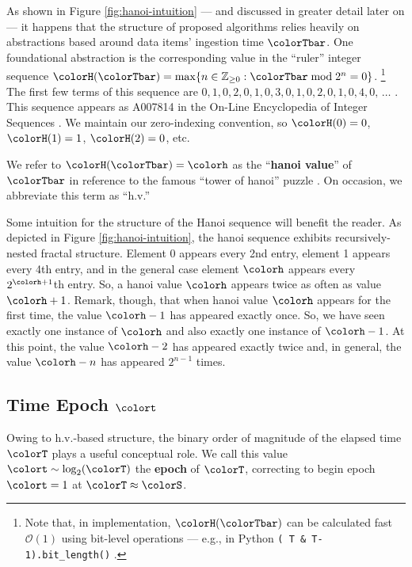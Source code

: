 

As shown in Figure \ref{fig:hanoi-intuition} --- and discussed in greater detail later on --- it happens that the structure of proposed algorithms relies heavily on abstractions based around data items' ingestion time $\colorTbar$.
One foundational abstraction is the corresponding value in the ``ruler'' integer sequence $\colorH(\colorTbar) = \max \{ n \in \mathbb{Z}_{\geq0} : \colorTbar \bmod 2^n = 0 \}$.%
\footnote{%
Note that, in implementation, $\colorH(\colorTbar)$ can be calculated fast $\mathcal{O}(1)$ using bit-level operations --- e.g., in Python \texttt{(~T \& T-1).bit\_length()} \citep{oeis}.
}
The first few terms of this sequence are $0,\allowbreak 1,\allowbreak 0,\allowbreak 2,\allowbreak 0,\allowbreak 1,\allowbreak 0,\allowbreak 3,\allowbreak 0,\allowbreak 1,\allowbreak 0,\allowbreak 2,\allowbreak 0,\allowbreak 1,\allowbreak 0,\allowbreak 4,\allowbreak 0,\allowbreak \,\ldots$ \quad .
This sequence appears as A007814 in the On-Line Encyclopedia of Integer Sequences \citep{oeis}.
We maintain our zero-indexing convention, so $\colorH(0) = 0$, $\colorH(1) = 1$, $\colorH(2) = 0$, etc.

We refer to $\colorH(\colorTbar) = \colorh$ as the ``\textbf{hanoi value}'' of $\colorTbar$ in reference to the famous ``tower of hanoi'' puzzle \citep{lucas1889jeux}.
On occasion, we abbreviate this term as ``h.v.''

Some intuition for the structure of the Hanoi sequence will benefit the reader.
As depicted in Figure \ref{fig:hanoi-intuition}, the hanoi sequence exhibits recursively-nested fractal structure.
Element 0 appears every 2nd entry, element 1 appears every 4th entry, and in the general case element $\colorh$ appears every $2^{\colorh+1}$th entry.
So, a hanoi value $\colorh$ appears twice as often as value $\colorh + 1$.
Remark, though, that when hanoi value $\colorh$ appears for the first time, the value $\colorh - 1$ has appeared exactly once.
So, we have seen exactly one instance of $\colorh$ and also exactly one instance of $\colorh - 1$.
At this point, the value $\colorh - 2$ has appeared exactly twice and, in general, the value $\colorh - n$ has appeared $2^{n - 1}$ times.

\subsection{Time Epoch $\colort$}
\label{sec:notation-epoch}

Owing to h.v.-based structure, the binary order of magnitude of the elapsed time $\colorT$ plays a useful conceptual role.
We call this value $\colort \sim \log_2(\colorT)$ the \textbf{epoch} of $\colorT$, correcting to begin epoch $\colort=1$ at $\colorT \approx \colorS$.

